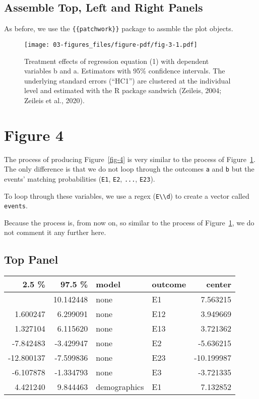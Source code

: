 \documentclass[
  a4paper,
  DIV=11,
  numbers=noendperiod]{scrreprt}
\begin{document}
\hypertarget{assemble-top-left-and-right-panels}{%
\subsection{Assemble Top, Left and Right
Panels}\label{assemble-top-left-and-right-panels}}

As before, we use the \texttt{\{\{patchwork\}\}} package to assmble the
plot objects.

\begin{figure}

{\centering \texttt{[image: 03-figures\_files/figure-pdf/fig-3-1.pdf]}

}

\caption{\label{fig-3}Treatment effects of regression equation (1) with
dependent variables b and a. Estimators with 95\% confidence intervals.
The underlying standard errors (``HC1'') are clustered at the individual
level and estimated with the R package sandwich (Zeileis, 2004; Zeileis
et al., 2020).}

\end{figure}

\hypertarget{figure-4}{%
\section{Figure 4}\label{figure-4}}

The process of producing Figure~\ref{fig-4} is very similar to the
process of Figure~\ref{fig-3}. The only difference is that we do not
loop through the outcomes \texttt{a} and \texttt{b} but the events'
matching probabilities (\texttt{E1}, \texttt{E2}, \texttt{...},
\texttt{E23}).

To loop through these variables, we use a regex
(\texttt{E\textbackslash{}\textbackslash{}d}) to create a vector called
\texttt{events}.

Because the process is, from now on, so similar to the process of
Figure~\ref{fig-3}, we do not comment it any further here.

\hypertarget{top-panel-1}{%
\subsection{Top Panel}\label{top-panel-1}}

\begin{longtable}[]{@{}rrllr@{}}
\toprule\noalign{}
2.5 \% & 97.5 \% & model & outcome & center \\
\midrule\noalign{}
\endhead
\bottomrule\noalign{}
\endlastfoot
4.983983 & 10.142448 & none & E1 & 7.563215 \\
1.600247 & 6.299091 & none & E12 & 3.949669 \\
1.327104 & 6.115620 & none & E13 & 3.721362 \\
-7.842483 & -3.429947 & none & E2 & -5.636215 \\
-12.800137 & -7.599836 & none & E23 & -10.199987 \\
-6.107878 & -1.334793 & none & E3 & -3.721335 \\
4.421240 & 9.844463 & demographics & E1 & 7.132852 \\
\end{longtable}
\end{document}
